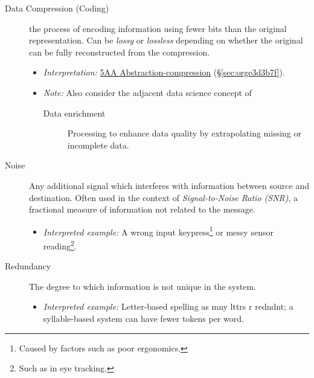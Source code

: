 \documentclass[logo,bsc,singlespacing,parskip]{infthesis}
\begin{document}
{\begin{mdframed}
\begin{description}
\item[{Data Compression (Coding)}] the process of encoding information using fewer bits than the original representation. Can be \emph{lossy} or \emph{lossless} depending on whether the original can be fully reconstructed from the compression.
\begin{itemize}
\item \emph{Interpretation:} \hyperref[sec:orge3d3b7f]{5AA Abstraction-compression} (\S \ref{sec:orge3d3b7f}).
\item \emph{Note:} Also consider the adjacent data science concept of
\begin{description}
\item[{Data enrichment}] Processing to enhance data quality by extrapolating missing or incomplete data.
\end{description}
\end{itemize}
\end{description}
\end{mdframed}

\begin{mdframed}
\begin{description}
\item[{Noise\label{noise}}] Any additional signal which interferes with information between source and destination.
Often used in the context of \emph{Signal-to-Noise Ratio (SNR)}, a fractional measure of information not related to the message.
\begin{itemize}
\item \emph{Interpreted example:} A wrong input keypress\footnote{Caused by factors such as poor ergonomics.} or messy sensor reading\footnote{Such as in eye tracking.}.
\end{itemize}
\end{description}
\end{mdframed}

\begin{mdframed}
\begin{description}
\item[{Redundancy}] The degree to which information is not unique in the system.
\begin{itemize}
\item \emph{Interpreted example:} Letter-based spelling as mny lttrs r redndnt; a syllable-based system can have fewer tokens per word.
\end{itemize}
\end{description}
\end{mdframed}

}
\end{document}
